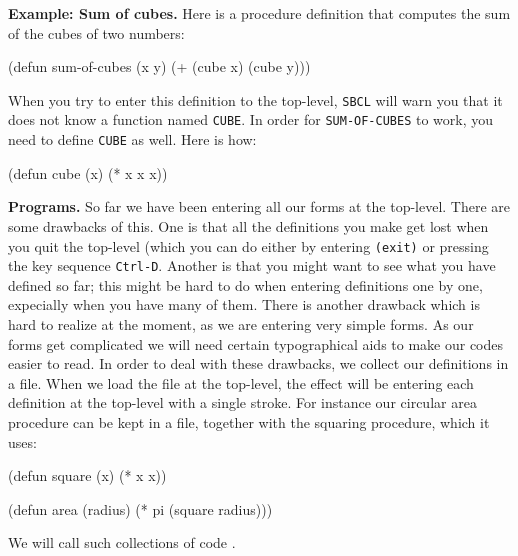 \documentclass[a4paper,11pt]{article}
\begin{document}
\begin{uenum}
\item {\bf Example: Sum of cubes.} Here is a procedure definition that computes the sum of the cubes of two numbers:

\begin{lispcode}
(defun sum-of-cubes (x y) (+ (cube x) (cube y)))
\end{lispcode}

When you try to enter this definition to the top-level, \Verb+SBCL+ will warn you that it does not know a function named \Verb+CUBE+. In order for \Verb+SUM-OF-CUBES+ to work, you need to define \Verb+CUBE+ as well. Here is how:   

\begin{lispcode}
(defun cube (x) (* x x x))
\end{lispcode}

\item {\bf Programs.} So far we have been entering all our forms at the top-level. There are some drawbacks of this. One is that all the definitions you make get lost when you quit the top-level (which you can do either by entering \Verb+(exit)+ or pressing the key sequence \Verb+Ctrl-D+. Another is that you might want to see what you have defined so far; this might be hard to do when entering definitions one by one, expecially when you have many of them. There is another drawback which is hard to realize at the moment, as we are entering very simple forms. As our forms get complicated we will need certain typographical aids to make our codes easier to read. In order to deal with these drawbacks, we collect our definitions in a file. When we load the file at the top-level, the effect will be entering each definition at the top-level with a single stroke. For instance our circular area procedure can be kept in a file, together with the squaring procedure, which it uses:   
 
\begin{lispcode}
(defun square (x)
  (* x x))

(defun area (radius)
  (* pi (square radius)))
\end{lispcode}

We will call such collections of code .

\end{uenum}


\noindent\hrulefill
\end{document}
